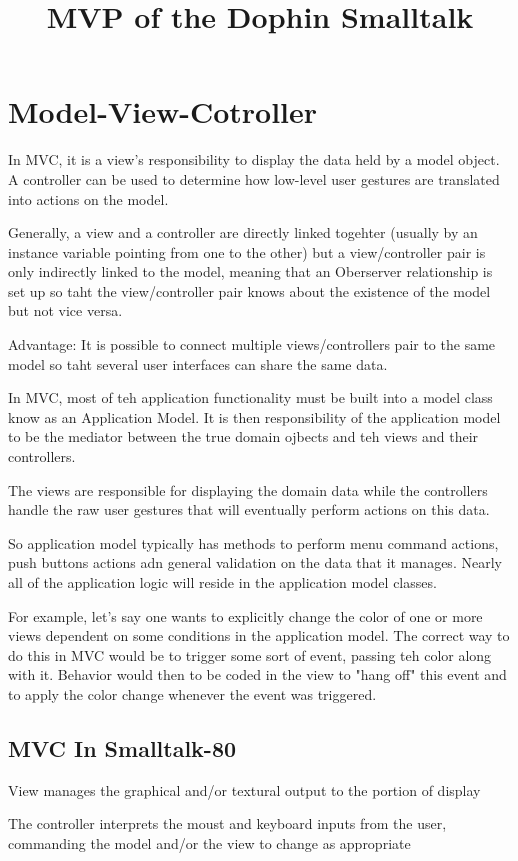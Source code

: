 \documentclass[a4paper, 11pt]{book}
\title{MVP of the Dophin Smalltalk}
\begin{document}
\chapter{Model-View-Cotroller}
In MVC, it is a view's responsibility to display the data held by a model
object. A controller can be used to determine how low-level user gestures are
translated into actions on the model.

Generally, a view and a controller are directly linked togehter (usually by an
instance variable pointing from one to the other) but a view/controller pair is
only indirectly linked to the model, meaning that an Oberserver relationship is
set up so taht the view/controller pair knows about the existence of the model
but not vice versa.

Advantage: It is possible to connect multiple views/controllers pair to the same
model so taht several user interfaces can share the same data.

In MVC, most of teh application functionality must be built into a model class
know as an Application Model. It is then responsibility of the application model
to be the mediator between the true domain ojbects and teh views and their
controllers.

The views are responsible for displaying the domain data while the controllers
handle the raw user gestures that will eventually perform actions on this data. 

So application model typically has methods to perform menu command actions, push
buttons actions adn general validation on the data that it manages. Nearly all
of the application logic will reside in the application model classes.

For example, let's say one wants to explicitly change the color of one or more
views dependent on some conditions in the application model. The correct way to
do this in MVC would be to trigger some sort of event, passing teh color along
with it. Behavior would then to be coded in the view to "hang off" this event
and to apply the color change whenever the event was triggered. 

\section{MVC In Smalltalk-80}
View manages the graphical and/or textural output to the portion of display

The controller interprets the moust and keyboard inputs from the user,
commanding the model and/or the view to change as appropriate
\end{document}
